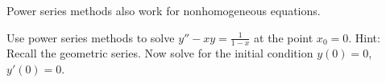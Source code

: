 \documentclass{ximera}
\begin{document}
\begin{exercise}%
    Power series methods also work for nonhomogeneous equations.
    \begin{tasks}
        \task Use power series methods to solve $y'' - x y = \frac{1}{1-x}$ at the point $x_0 = 0$. Hint: Recall the geometric series.
        \task Now solve for the initial condition $y(0)=0$, $y'(0) = 0$.
    \end{tasks}
\end{exercise}

\end{document}
